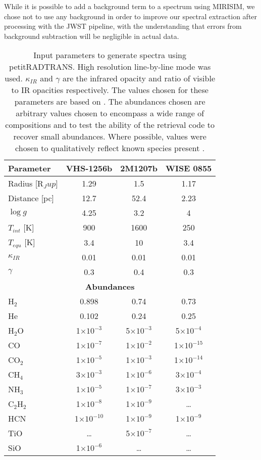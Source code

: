 While it is possible to add a background term to a spectrum using MIRISIM, we chose not to use any background in order to improve our spectral extraction after processing with the JWST pipeline, with the understanding that errors from background subtraction will be negligible in actual data.
\begin{table}[t]
	\centering
	\begin{tabular}{l|ccc}
		\toprule
		\textbf{Parameter} & \textbf{VHS-1256b} & \textbf{2M1207b} & \textbf{WISE 0855}\\
		\midrule
		Radius [R$_Jup$] & 1.29 & 1.5 & 1.17\\
		Distance [pc] & 12.7 & 52.4 & 2.23\\
		$\log g$ & 4.25 & 3.2 & 4\\
		$T_{int}$ [K]& 900 & 1600 & 250\\
		$T_{equ}$ [K]& 3.4 & 10 & 3.4\\
		$\kappa_{IR}$ & 0.01 & 0.01 & 0.01\\
		$\gamma$ & 0.3 & 0.4 & 0.3\\
		\midrule
		\multicolumn{4}{c}{\textbf{Abundances}}\\
		\midrule
		 H$_{2}$ & 0.898 & 0.74 & 0.73\\
		 He & 0.102 & 0.24 & 0.25\\
		 H$_{2}$O & 1$\times10^{-3}$ & 5$\times10^{-3}$ & 5$\times10^{-4}$\\
		 CO & 1$\times10^{-7}$& 1$\times10^{-2}$ & 1$\times10^{-15}$\\
		 CO$_{2}$ & 1$\times10^{-5}$& 1$\times10^{-3}$ & 1$\times10^{-14}$\\
		 CH$_{4}$ & 3$\times10^{-3}$& 1$\times10^{-6}$ & 3$\times10^{-4}$\\
		 NH$_{3}$ & 1$\times10^{-5}$& 1$\times10^{-7}$ & 3$\times10^{-3}$\\
		 C$_{2}$H$_{2}$ & 1$\times10^{-8}$& 1$\times10^{-9}$& \ldots \\
		 HCN & 1$\times10^{-10}$ & 1$\times10^{-9}$ & 1$\times10^{-9}$ \\
		 TiO & \ldots & 5$\times10^{-7}$ & \ldots \\
		 SiO & 1$\times10^{-6}$ &  \ldots & \ldots \\
		\bottomrule
	\end{tabular}
	\caption[petitRADTRANS inputs.]{Input parameters to generate spectra using petitRADTRANS. High resolution line-by-line mode was used. $\kappa_{IR}$ and $\gamma$ are the infrared opacity and ratio of visible to IR opacities respectively. The values chosen for these parameters are based on \parencite{Molliere2019}. The abundances chosen are arbitrary values chosen to encompass a wide range of compositions and to test the ability of the retrieval code to recover small abundances. Where possible, values were chosen to qualitatively reflect known species present \parencite{Miles2018}. }
	\label{tab:inputparams}
\end{table}

